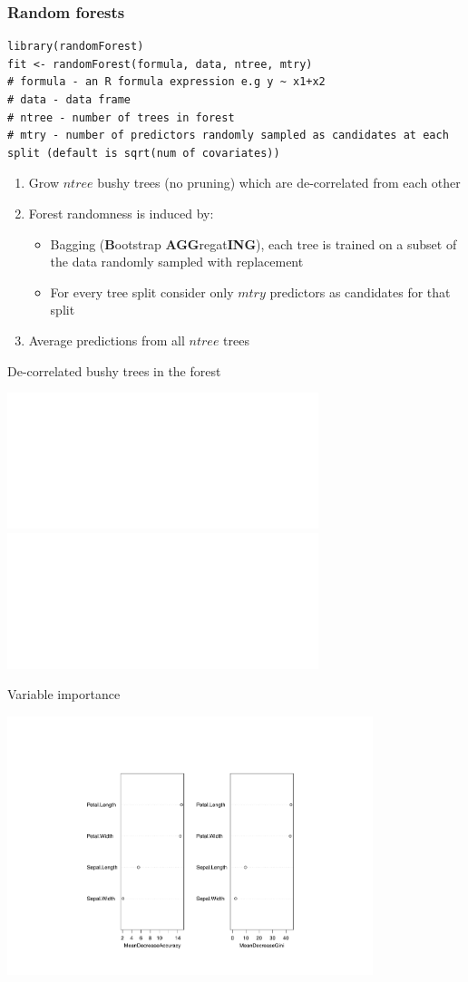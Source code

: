 \documentclass[pdf]{beamer}
\begin{document}
\begin{frame}[fragile]
\frametitle{Random forests}
\begin{lstlisting}[style=RCode]
library(randomForest)
fit <- randomForest(formula, data, ntree, mtry)
# formula - an R formula expression e.g y ~ x1+x2
# data - data frame
# ntree - number of trees in forest
# mtry - number of predictors randomly sampled as candidates at each split (default is sqrt(num of covariates))
\end{lstlisting}
\begin{enumerate}\addtolength{\itemsep}{0.5\baselineskip}
	\item<2-> Grow $ntree$ bushy trees (no pruning) which are de-correlated from each other
	\item<3-> Forest randomness is induced by:
		\begin{itemize}
			\item<3-> Bagging (\textbf{B}ootstrap \textbf{AGG}regat\textbf{ING}), each tree is trained
			on a subset of the data randomly sampled with replacement
			\item<3-> For every tree split consider only $mtry$ predictors as candidates for that split 
		\end{itemize}
	\item<4-> Average predictions from all $ntree$ trees
\end{enumerate}
\end{frame}
\begin{frame}{De-correlated bushy trees in the forest}
	\begin{center}
		\includegraphics<1>[width=0.68\textwidth]{treeFit1.pdf}
		\includegraphics<2>[width=0.68\textwidth]{treeFit2.pdf}
	\end{center}
\end{frame}
\begin{frame}{Variable importance}
	\begin{center}
		\includegraphics[width=0.8\textwidth]{varImportance.pdf}
	\end{center}
\end{frame}
\end{document}
